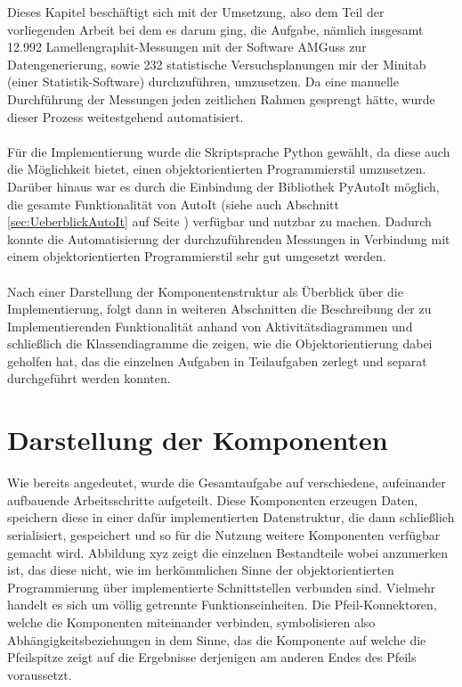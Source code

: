 \documentclass[
fontsize=10pt, 
listof = totoc,
parskip = half	
]{report}
\begin{document}
Dieses Kapitel beschäftigt sich mit der Umsetzung, also dem Teil der vorliegenden Arbeit bei dem es darum ging, die Aufgabe, nämlich insgesamt 12.992 Lamellengraphit-Messungen mit der Software AMGuss zur Datengenerierung, sowie 232 statistische Versuchsplanungen mir der Minitab (einer Statistik-Software) durchzuführen, umzusetzen. Da eine manuelle Durchführung der Messungen jeden zeitlichen Rahmen gesprengt hätte, wurde dieser Prozess weitestgehend automatisiert.
\\\\
\noindent Für die Implementierung wurde die Skriptsprache Python gewählt, da diese auch die Möglichkeit bietet, einen objektorientierten Programmierstil umzusetzen. Darüber hinaus war es durch die Einbindung der Bibliothek PyAutoIt möglich, die gesamte Funktionalität von AutoIt (siehe auch Abschnitt \ref{sec:UeberblickAutoIt} auf Seite \pageref{sec:UeberblickAutoIt}) verfügbar und nutzbar zu machen. Dadurch konnte die Automatisierung der durchzuführenden Messungen in Verbindung mit einem objektorientierten Programmierstil sehr gut umgesetzt werden.
\\\\
\noindent Nach einer Darstellung der Komponentenstruktur als Überblick über die Implementierung, folgt dann in weiteren Abschnitten die Beschreibung der zu Implementierenden Funktionalität anhand von Aktivitätsdiagrammen und schließlich die Klassendiagramme die zeigen, wie die Objektorientierung dabei geholfen hat, das die einzelnen Aufgaben in Teilaufgaben zerlegt und separat durchgeführt werden konnten.

\newpage

\section{Darstellung der Komponenten}
\label{sec:Komponentendarstellung}

Wie bereits angedeutet, wurde die Gesamtaufgabe auf verschiedene, aufeinander aufbauende Arbeitsschritte aufgeteilt. Diese Komponenten erzeugen Daten, speichern diese in einer dafür implementierten Datenstruktur, die dann schließlich serialisiert, gespeichert und so für die Nutzung weitere Komponenten verfügbar gemacht wird. Abbildung xyz zeigt die einzelnen Bestandteile wobei anzumerken ist, das diese nicht, wie im herkömmlichen Sinne der objektorientierten Programmierung über implementierte Schnittstellen verbunden sind. Vielmehr handelt es sich um völlig getrennte Funktionseinheiten. Die Pfeil-Konnektoren, welche die Komponenten miteinander verbinden, symbolisieren also Abhängigkeitsbeziehungen in dem Sinne, das die Komponente auf welche die Pfeilspitze zeigt auf die Ergebnisse derjenigen am anderen Endes des Pfeils voraussetzt.
\end{document}
